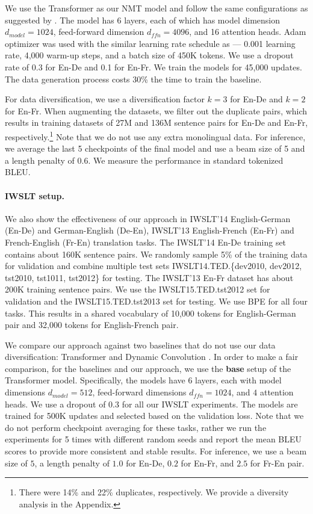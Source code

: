 \documentclass{article}
\begin{document}
We use the Transformer \citep{vaswani2017attention} as our NMT model and follow the same configurations as suggested by \citet{scaling_nmt_ott2018scaling}. The model has 6 layers, each of which has model dimension $d_{model}=1024$, feed-forward dimension $d_{ffn}=4096$, and 16 attention heads. 
Adam optimizer \citep{kingma2014adam} was used with the similar learning rate schedule as \citet{scaling_nmt_ott2018scaling} --- 0.001 learning rate, 4,000 warm-up steps, and a batch size of 450K tokens. We use a dropout rate of 0.3 for En-De and 0.1 for En-Fr. We train the models for 45,000 updates. The data generation process costs 30\% the time to train the baseline.

For data diversification, we use a diversification factor $k=3$ for En-De and $k=2$ for En-Fr. 
When augmenting the datasets, we filter out the duplicate pairs, which results in training datasets of 27M and 136M sentence pairs for En-De and En-Fr, respectively.\footnote{There were 14\% and 22\% duplicates, respectively. We provide a diversity analysis in the Appendix.} Note that we do {not} use any extra monolingual data. For inference, we average the last 5 checkpoints of the final model and use a beam size of 5 and a length penalty of 0.6. We measure the performance in standard tokenized BLEU.

\paragraph{IWSLT setup.} We also show the effectiveness of our approach in IWSLT'14 English-German (En-De) and German-English (De-En), IWSLT'13 English-French (En-Fr) and French-English (Fr-En) translation tasks. The IWSLT'14 En-De training set contains about 160K sentence pairs. We randomly sample 5\% of the training data for validation and combine multiple test sets IWSLT14.TED.\{dev2010, dev2012, tst2010, tst1011,  tst2012\} for testing. The IWSLT'13 En-Fr dataset has about 200K training sentence pairs.  We use the IWSLT15.TED.tst2012 set for validation and the IWSLT15.TED.tst2013 set for testing. We use BPE for all four tasks. This results in a shared vocabulary of 10,000 tokens for English-German pair and 32,000 tokens for English-French pair. 

We compare our approach against two baselines that do not use our data diversification: Transformer \citep{vaswani2017attention} and Dynamic Convolution \citep{payless_wu2018}. In order to make a fair comparison, for the baselines and our approach, we use the \textbf{base} setup of the Transformer model. Specifically, the models have 6 layers, each with model dimensions $d_{model}=512$, feed-forward dimensions $d_{ffn}=1024$, and $4$ attention heads. 
We use a dropout of $0.3$ for all our IWSLT experiments. 
The models are trained for 500K updates and selected based on the validation loss. Note that we do not perform checkpoint averaging for these tasks, rather we run the experiments for 5 times {with different random seeds} and report the mean BLEU scores to provide more consistent and stable results. 
For inference, we use a beam size of $5$, a length penalty of $1.0$ for En-De, $0.2$ for En-Fr, and $2.5$ for Fr-En pair. 
\end{document}
